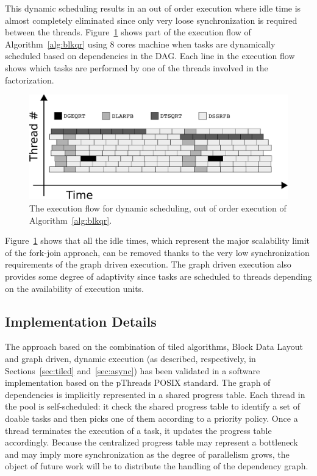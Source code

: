 \documentclass{article}
\begin{document}
This dynamic scheduling results in an out of order execution where
idle time is almost completely eliminated since only very loose
synchronization is required between the threads.
Figure~\ref{fig:flow} shows part of the execution flow of
Algorithm~\ref{alg:blkqr} using 8 cores machine when tasks are
dynamically scheduled based on dependencies in the DAG. Each line in
the execution flow shows which tasks are performed by one of the
threads involved in the factorization.

\begin{figure}[!h]
  \begin{center}
    \includegraphics[width=\textwidth]{images/qr_flow_brutus_bw}
  \caption{\label{fig:flow}The execution flow for dynamic scheduling,
    out of order execution of Algorithm~\ref{alg:blkqr}.}
  \end{center}
\end{figure}

Figure~\ref{fig:flow} shows that all the idle times, which represent
the major scalability limit of the fork-join approach, can be removed
thanks to the very low synchronization requirements of the graph
driven execution. The graph driven execution also provides some degree
of adaptivity since tasks are scheduled to threads depending on the
availability of execution units.

\subsection{Implementation Details}
\label{sec:implementation}
The approach based on the combination of tiled algorithms, Block Data
Layout and graph driven, dynamic execution (as described,
respectively, in Sections~\ref{sec:tiled} and~\ref{sec:async}) has
been validated in a software implementation based on the pThreads
POSIX standard. The graph of dependencies is implicitly represented in
a shared progress table. Each thread in the pool is self-scheduled: it
check the shared progress table to identify a set of doable tasks and
then picks one of them according to a priority policy. Once a thread
terminates the execution of a task, it updates the progress table
accordingly. Because the centralized progress table may represent a
bottleneck and may imply more synchronization as the degree of
parallelism grows, the object of future work will be to distribute the
handling of the dependency graph.
\end{document}
